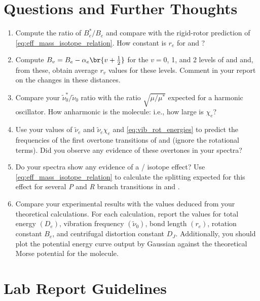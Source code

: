 \section{Questions and Further Thoughts} %
\label{sec:questions_and_further_thoughts}

\begin{enumerate}
	\item Compute the ratio of \( B_e^*/B_e \) and compare with the rigid-rotor prediction of \cref{eq:eff_mass_isotope_relation}. 
	How constant is \( r_e \) for  and ?
	\item Compute \( B_v = B_e - \alpha_e\br{v + \tfrac{1}{2}} \) for the \( v = 0 \), \num{1}, and \num{2} levels of  and  and, from these, obtain average \( r_v \) values for these levels. 
	Comment in your report on the changes in these distances. 
	\item Compare your \( \widetilde{\nu}_0^*/\widetilde{\nu}_0 \) ratio with the ratio \( \sqrt{\mu/\mu^*} \) expected for a harmonic oscillator. How anharmonic is the  molecule: i.e., how large is \( \chi_e \)?
	\item Use your values of \( \widetilde{\nu}_e \) and \( \widetilde{\nu}_e \chi_e \) and \cref{eq:vib_rot_energies} to predict the frequencies of the first overtone transitions of  and  (ignore the rotational terms). 
	Did you observe any evidence of these overtones in your spectra? 
	\item Do your spectra show any evidence of a / isotope effect? 
	Use \cref{eq:eff_mass_isotope_relation} to calculate the splitting expected for this effect for several \emph{P} and \emph{R} branch transitions in  and . 
	\item Compare your experimental results with the values deduced from your theoretical calculations. 
	For each calculation, report the values for total energy \( (D_e) \), vibration frequency \( (\widetilde{\nu}_0) \), bond length \( (r_e) \), rotation constant \( B_e \), and centrifugal distortion constant \( D_J \). 
	Additionally, you should plot the potential energy curve output by Gaussian against the theoretical Morse potential for the molecule. 
\end{enumerate}


\section{Lab Report Guidelines} %
\label{sec:lab_report_guidelines}

